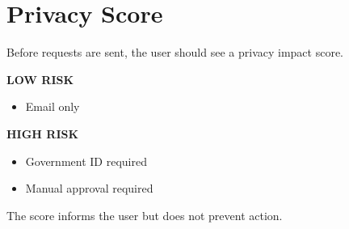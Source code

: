 
\chapter{Privacy Score}

Before requests are sent, the user should see a privacy impact score.

\textbf{LOW RISK}
\begin{itemize}
	\item Email only
\end{itemize}

\textbf{HIGH RISK}
\begin{itemize}
	\item Government ID required
	\item Manual approval required
\end{itemize}


The score informs the user but does not prevent action.


\sentinelchapterend
